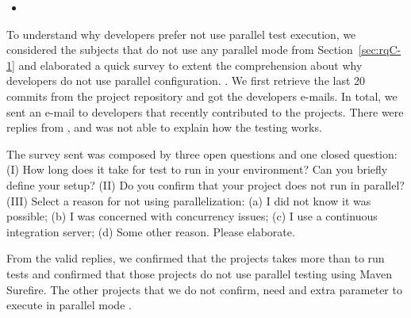 \begin{itemize}
	\item \textbf{\RQE{}}
\end{itemize}

To understand why developers prefer not use parallel test execution,
we considered the \numNonParallel{} subjects that do not use any
parallel mode from Section~\ref{sec:rqC-1} and elaborated a
quick survey to extent the comprehension about why developers do not
use parallel configuration. .
We first retrieve the last 20 commits from the project repository and
got the developers e-mails. In total, we sent an e-mail to
\emailsSent{} developers that recently contributed to the
\numNonParallel{} projects.
There were \emailsAnswered{} replies from \emailsProjectsAnswered{}, 
and \emailsFalseAnswers{} was not able to explain how the testing works.

The survey sent was composed by three open questions and one closed
question: (I) How long does it take for test to run in your
environment? Can you briefly define your setup? (II) Do you confirm
that your project does not run in parallel? (III) Select a reason for
not using parallelization: (a) I did not know it was possible; (b) I
was concerned with concurrency issues; (c) I use a continuous
integration server; (d) Some other reason. Please elaborate.


From the valid replies, we confirmed that the projects takes more than
 to run tests and \emailsSeq{} confirmed that those projects do not use 
parallel testing using Maven Surefire. The other projects that we do not 
confirm, need and extra parameter to execute in parallel mode .

